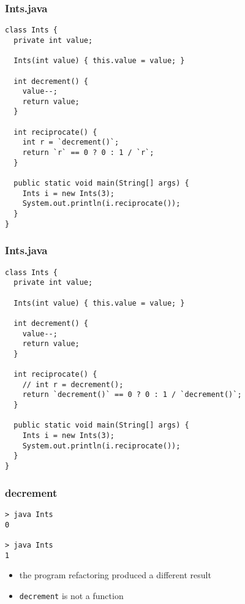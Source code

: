 \begin{frame}[fragile]
\frametitle{Ints.java}
\begin{lstlisting}
class Ints {
  private int value;

  Ints(int value) { this.value = value; }

  int decrement() {
    value--;
    return value;
  }

  int reciprocate() {
    int r = `decrement()`;
    return `r` == 0 ? 0 : 1 / `r`;
  }

  public static void main(String[] args) {
    Ints i = new Ints(3);
    System.out.println(i.reciprocate());
  }
}
\end{lstlisting}
\end{frame}

\begin{frame}[fragile]
\frametitle{Ints.java}
\begin{lstlisting}
class Ints {
  private int value;

  Ints(int value) { this.value = value; }

  int decrement() {
    value--;
    return value;
  }

  int reciprocate() {
    // int r = decrement();
    return `decrement()` == 0 ? 0 : 1 / `decrement()`;
  }

  public static void main(String[] args) {
    Ints i = new Ints(3);
    System.out.println(i.reciprocate());
  }
}
\end{lstlisting}
\end{frame}

\begin{frame}[fragile]
\frametitle{decrement}
\begin{block}{}
\begin{lstlisting}
> java Ints
0

> java Ints
1
\end{lstlisting}
\end{block}
\begin{itemize}
  \item<1> the program refactoring produced a different result
  \item<2> \lstinline$decrement$ is not a function
\end{itemize}
\end{frame}

